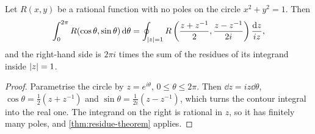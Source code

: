 \begin{theorem}\label{thm:trig-integrals}
  Let $R(x, y)$ be a rational function with no poles on the circle
  $x^2 + y^2 = 1$. Then
  \[
    \int_0^{2\pi} R(\cos\theta, \sin\theta) \mathop{}\!\mathrm{d}\theta
    = \oint_{\lvert z\rvert = 1}
      R\left( \frac{z + z^{-1}}{2}, \frac{z - z^{-1}}{2i} \right)
      \frac{\mathop{}\!\mathrm{d} z}{iz},
  \]
  and the right-hand side is $2\pi i$ times the sum of the residues of its
  integrand inside $\lvert z\rvert = 1$.
\end{theorem}

\begin{proof}
  Parametrise the circle by $z = e^{i\theta}$, $0 \leq \theta \leq 2\pi$. Then
  $\dd z = iz \dd\theta$, $\cos\theta = \frac12(z + z^{-1})$ and
  $\sin\theta = \frac{1}{2i}(z - z^{-1})$, which turns the contour integral
  into the real one. The integrand on the right is rational in $z$, so it has
  finitely many poles, and \cref{thm:residue-theorem} applies.
\end{proof}
